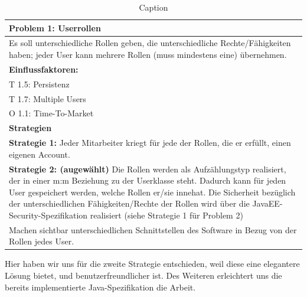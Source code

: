 \documentclass[enabledeprecatedfontcommands,fontsize=12pt,paper=a4,twoside]{scrartcl}
\begin{document}
\begin{table}[H]
    \centering
    \begin{tabular}{|p{15cm}|}
    \hline
          \textbf{Problem 1:} Userrollen \\ \hline
          Es soll unterschiedliche Rollen geben, die unterschiedliche Rechte/Fähigkeiten haben; jeder User kann mehrere Rollen (muss mindestens eine) übernehmen. \\ \hline
          \textbf{Einflussfaktoren: } \\
          T 1.5: Persistenz \\
          T 1.7: Multiple Users\\
          O 1.1: Time-To-Market \\
          \hline
          \textbf{Strategien} \\ \hline

          \textbf{Strategie 1:} Jeder Mitarbeiter kriegt für jede der Rollen, die er erfüllt, einen eigenen Account. \\
          \textbf{Strategie 2: (augewählt)} Die Rollen werden als Aufzählungstyp realisiert, der in einer m:m Beziehung zu der Userklasse steht. Dadurch kann für jeden User gespeichert werden, welche Rollen er/sie innehat. Die Sicherheit bezüglich der unterschiedlichen Fähigkeiten/Rechte der Rollen wird über die JavaEE-Security-Spezifikation realisiert (siehe Strategie 1 für Problem 2)\\
          Machen sichtbar unterschiedlichen Schnittstellen des Software in Bezug von der Rollen jedes User. \\ \hline
    \end{tabular}

    \caption{Caption}
    \label{tab:my_label}
\end{table}
Hier haben wir uns für die zweite Strategie entschieden, weil diese eine elegantere Lösung bietet, und benutzerfreundlicher ist. Des Weiteren erleichtert uns die bereits implementierte Java-Spezifikation die Arbeit. \\
\end{document}

